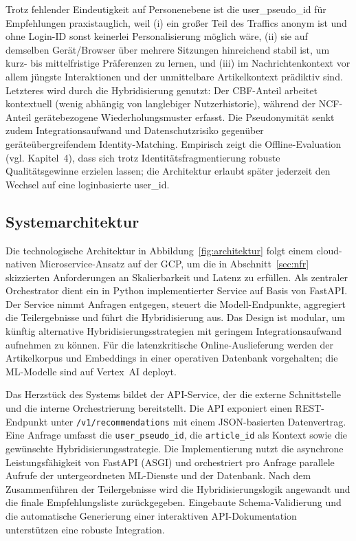 Trotz fehlender Eindeutigkeit auf Personenebene ist die user\_pseudo\_id für Empfehlungen praxistauglich,
weil (i) ein großer Teil des Traffics anonym ist und ohne Login-ID sonst keinerlei Personalisierung möglich wäre, 
(ii) sie auf demselben Gerät/Browser über mehrere Sitzungen hinreichend stabil ist, um kurz- bis mittelfristige 
Präferenzen zu lernen, und (iii) im Nachrichtenkontext vor allem jüngste Interaktionen und der unmittelbare 
Artikelkontext prädiktiv sind. Letzteres wird durch die Hybridisierung genutzt: Der CBF-Anteil arbeitet kontextuell 
(wenig abhängig von langlebiger Nutzerhistorie), während der NCF-Anteil gerätebezogene Wiederholungsmuster erfasst. 
Die Pseudonymität senkt zudem Integrationsaufwand und Datenschutzrisiko gegenüber geräteübergreifendem Identity-Matching. 
Empirisch zeigt die Offline-Evaluation (vgl. Kapitel~4), dass sich trotz Identitätsfragmentierung 
robuste Qualitätsgewinne erzielen lassen; die Architektur erlaubt später jederzeit den Wechsel auf eine 
loginbasierte user\_id.

\subsection{Systemarchitektur}
Die technologische Architektur in Abbildung~\ref{fig:architektur} folgt einem cloud-nativen Microservice-Ansatz auf der \ac{GCP}, um die in 
Abschnitt~\ref{sec:nfr} skizzierten Anforderungen an Skalierbarkeit und Latenz zu erfüllen. Als zentraler 
Orchestrator dient ein in Python implementierter Service auf Basis von FastAPI. Der Service nimmt Anfragen entgegen, 
steuert die Modell-Endpunkte, aggregiert die Teilergebnisse und führt die Hybridisierung aus. Das Design ist modular, 
um künftig alternative Hybridisierungsstrategien mit geringem Integrationsaufwand aufnehmen zu können. 
Für die latenzkritische Online-Auslieferung werden der Artikelkorpus und Embeddings in einer operativen 
Datenbank vorgehalten; die ML-Modelle sind auf Vertex~AI deployt.


\label{sec:api_design}
Das Herzstück des Systems bildet der API-Service, der die externe Schnittstelle und die interne Orchestrierung 
bereitstellt. Die API exponiert einen REST-Endpunkt unter \texttt{/v1/recommendations} mit einem JSON-basierten 
Datenvertrag. Eine Anfrage umfasst die \texttt{user\_pseudo\_id}, die \texttt{article\_id} als Kontext sowie die 
gewünschte Hybridisierungsstrategie. Die Implementierung nutzt die asynchrone Leistungsfähigkeit von FastAPI 
(\ac{ASGI}) und orchestriert pro Anfrage parallele Aufrufe der untergeordneten ML-Dienste und der Datenbank. 
Nach dem Zusammenführen der Teilergebnisse wird die Hybridisierungslogik angewandt und die finale Empfehlungsliste 
zurückgegeben. Eingebaute Schema-Validierung und die automatische Generierung einer interaktiven API-Dokumentation 
unterstützen eine robuste Integration.

